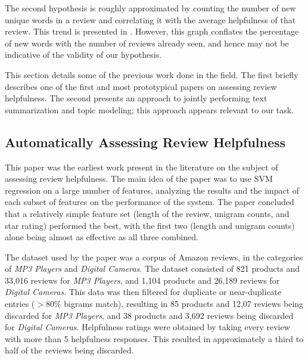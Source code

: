\documentclass[letter,12pt]{article}
\begin{document}
The second hypothesis is roughly approximated by counting the number of
	new unique words in a review and correlating it with the average helpfulness
	of that review.
This trend is presented in .
However, this graph conflates the percentage of new words with the number of
	reviews already seen, and hence may not be indicative of the validity
	of our hypothesis.




This section details some of the previous work done in the field.
The first briefly describes one of the first and most prototypical papers
	on assessing review helpfulness.
The second presents an approach to jointly performing text summarization
	and topic modeling; this approach appears relevant to our task.

\subsection{Automatically Assessing Review Helpfulness \cite{2006kim-helpfulness}}
This paper was the earliest work present in the literature on the subject of assessing review helpfulness.
The main idea of the paper was to use SVM regression on a large number of features,
	analyzing the results and the impact of each subset of features on the performance
	of the system.
The paper concluded that a relatively simple feature set (length of the review,
	unigram counts, and star rating) performed the best, with the first two
	(length and unigram counts) alone being almost as effective as all three
	combined.

The dataset used by the paper was a corpus of Amazon reviews, in the categories
	of {\em MP3 Players} and {\em Digital Cameras}.
The dataset consisted of 821 products and 33,016 reviews for {\em MP3 Players},
	and 1,104 products and 26,189 reviews for {\em Digital Cameras}.
This data was then filtered for duplicate or near-duplicate entries ($>80\%$ bigrams match),
	resulting in 85 products and 12,07 reviews being discarded for {\em MP3 Players},
	and 38 products and 3,692 reviews being discarded for {\em Digital Cameras}.
Helpfulness ratings were obtained by taking every review with more than 5 helpfulness
	responses.
This resulted in approximately a third to half of the reviews being discarded.
\end{document}
